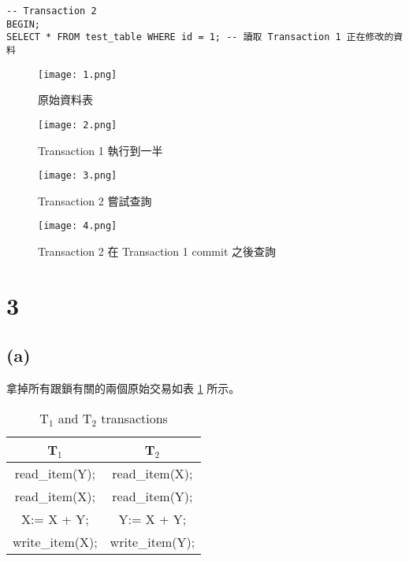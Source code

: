\documentclass{article}
\begin{document}
\begin{verbatim}
-- Transaction 2
BEGIN;
SELECT * FROM test_table WHERE id = 1; -- 讀取 Transaction 1 正在修改的資料
\end{verbatim}
\begin{figure}[H]  %
    \centering
    \begin{minipage}{0.45\textwidth}  %
        \centering
        \texttt{[image: 1.png]} %
        \caption{原始資料表}
        \label{figure:1}
    \end{minipage}
    \hfill %
    \begin{minipage}{0.45\textwidth}  %
        \centering
        \texttt{[image: 2.png]} %
        \caption{Transaction 1 執行到一半}
        \label{figure:2}
    \end{minipage}
\end{figure}
\begin{figure}[H]  %
    \centering
    \begin{minipage}{0.45\textwidth}  %
        \centering
        \texttt{[image: 3.png]} %
        \caption{Transaction 2 嘗試查詢}
        \label{figure:3}
    \end{minipage}
    \hfill %
    \begin{minipage}{0.45\textwidth}  %
        \centering
        \texttt{[image: 4.png]} %
        \caption{Transaction 2 在 Transaction 1 commit 之後查詢}
        \label{figure:4}
    \end{minipage}
\end{figure}

\section*{3}
\subsection*{(a)}
拿掉所有跟鎖有關的兩個原始交易如表 \ref{tab:2_a} 所示。
\begin{table}[H]
    \centering
    \begin{tabular}{|c|c|}
    \toprule
    \textbf{T$_1$} & \textbf{T$_2$} \\
    \midrule
    read\_item(Y); & read\_item(X); \\
    read\_item(X); & read\_item(Y); \\
    X:= X + Y; & Y:= X + Y; \\
    write\_item(X); & write\_item(Y); \\
    \bottomrule
    \end{tabular}
    \caption{T$_1$ and T$_2$ transactions}
    \label{tab:2_a}
\end{table}
\end{document}
